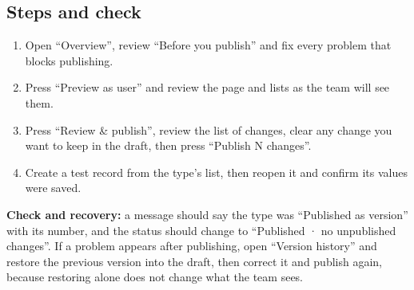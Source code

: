\subsection{Steps and check}
\begin{enumerate}
\item Open “Overview”, review “Before you publish” and fix every problem that blocks publishing.
\item Press “Preview as user” and review the page and lists as the team will see them.
\item Press “Review \& publish”, review the list of changes, clear any change you want to keep in the draft, then press “Publish N changes”.
\item Create a test record from the type's list, then reopen it and confirm its values were saved.
\end{enumerate}

\textbf{Check and recovery:} a message should say the type was “Published as version” with its number, and the status should change to “Published · no unpublished changes”. If a problem appears after publishing, open “Version history” and restore the previous version into the draft, then correct it and publish again, because restoring alone does not change what the team sees.
